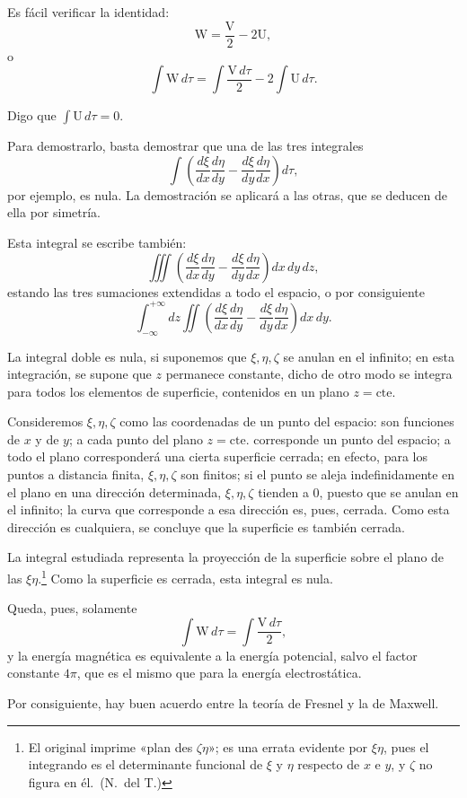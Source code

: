 Es fácil verificar la identidad:
\[
\mathrm{W}=\frac{\mathrm{V}}{2}-2\mathrm{U},
\]
o
\[
\int\mathrm{W}\,d\tau=\int\frac{\mathrm{V}\,d\tau}{2}-2\int\mathrm{U}\,d\tau.
\]

Digo que $\int\mathrm{U}\,d\tau=0$.

Para demostrarlo, basta demostrar que una de las tres integrales
\[
\int\left(\frac{d\xi}{dx}\frac{d\eta}{dy}-\frac{d\xi}{dy}\frac{d\eta}{dx}\right)d\tau,
\]
por ejemplo, es nula. La demostración se aplicará a las otras, que se
deducen de ella por simetría.

Esta integral se escribe también:
\[
\iiint\left(\frac{d\xi}{dx}\frac{d\eta}{dy}-\frac{d\xi}{dy}\frac{d\eta}{dx}\right)dx\,dy\,dz,
\]
estando las tres sumaciones extendidas a todo el espacio, o por
consiguiente
\[
\int_{-\infty}^{+\infty}dz\iint\left(\frac{d\xi}{dx}\frac{d\eta}{dy}
-\frac{d\xi}{dy}\frac{d\eta}{dx}\right)dx\,dy.
\]

La integral doble es nula, si suponemos que $\xi,\eta,\zeta$ se anulan en
el infinito; en esta integración, se supone que $z$ permanece constante,
dicho de otro modo se integra para todos los elementos de superficie,
contenidos en un plano $z=\text{cte.}$

Consideremos $\xi,\eta,\zeta$ como las coordenadas de un punto del
espacio: son funciones de $x$ y de $y$; a cada punto del plano
$z=\text{cte.}$ corresponde un punto del espacio; a todo el plano
corresponderá una cierta superficie cerrada; en efecto, para los puntos a
distancia finita, $\xi,\eta,\zeta$ son finitos; si el punto se aleja
indefinidamente en el plano en una dirección determinada, $\xi,\eta,\zeta$
tienden a $0$, puesto que se anulan en el infinito; la curva que
corresponde a esa dirección es, pues, cerrada. Como esta dirección es
cualquiera, se concluye que la superficie es también cerrada.

La integral estudiada representa la proyección de la superficie sobre el
plano de las $\xi\eta$.\footnote{El original imprime «plan des
$\zeta\eta$»; es una errata evidente por $\xi\eta$, pues el integrando es
el determinante funcional de $\xi$ y $\eta$ respecto de $x$ e $y$, y
$\zeta$ no figura en él.~(N.~del T.)} Como la superficie es cerrada, esta
integral es nula.

Queda, pues, solamente
\[
\int\mathrm{W}\,d\tau=\int\frac{\mathrm{V}\,d\tau}{2},
\]
y la energía magnética es equivalente a la energía potencial, salvo el
factor constante $4\pi$, que es el mismo que para la energía
electrostática.

Por consiguiente, hay buen acuerdo entre la teoría de Fresnel y la de
Maxwell.

